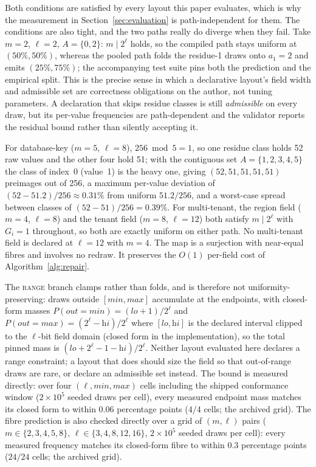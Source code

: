 \documentclass{svproc}
\begin{document}
Both conditions are satisfied by every layout this paper evaluates, which is why the measurement in Section~\ref{sec:evaluation} is path-independent for them. The conditions are also tight, and the two paths really do diverge when they fail. Take $m=2$, $\ell=2$, $A = \{0,2\}$: $m \mid 2^\ell$ holds, so the compiled path stays uniform at $(50\%, 50\%)$, whereas the pooled path folds the residue-1 draws onto $a_1 = 2$ and emits $(25\%, 75\%)$; the accompanying test suite pins both the prediction and the empirical split. This is the precise sense in which a declarative layout's field width and admissible set are correctness obligations on the author, not tuning parameters. A declaration that skips residue classes is still \emph{admissible} on every draw, but its per-value frequencies are path-dependent and the validator reports the residual bound rather than silently accepting it.

For database-key ($m=5$, $\ell=8$), $256 \bmod 5 = 1$, so one residue class holds 52 raw values and the other four hold 51; with the contiguous set $A = \{1,2,3,4,5\}$ the class of index~0 (value~1) is the heavy one, giving $(52,51,51,51,51)$ preimages out of 256, a maximum per-value deviation of $(52 - 51.2)/256 \approx 0.31\%$ from uniform $51.2/256$, and a worst-case spread between classes of $(52-51)/256 = 0.39\%$. For multi-tenant, the region field ($m=4$, $\ell=8$) and the tenant field ($m=8$, $\ell=12$) both satisfy $m \mid 2^\ell$ with $G_i = 1$ throughout, so both are exactly uniform on either path. No multi-tenant field is declared at $\ell=12$ with $m=4$. The map is a surjection with near-equal fibres and involves no redraw. It preserves the $O(1)$ per-field cost of Algorithm~\ref{alg:repair}.

The \textsc{range} branch clamps rather than folds, and is therefore not uniformity-preserving: draws outside $[\textit{min},\textit{max}]$ accumulate at the endpoints, with closed-form masses $P(\textit{out} = \textit{min}) = (\textit{lo}+1)/2^\ell$ and $P(\textit{out} = \textit{max}) = (2^\ell-\textit{hi})/2^\ell$ where $[\textit{lo},\textit{hi}]$ is the declared interval clipped to the $\ell$-bit field domain (closed form in the implementation), so the total pinned mass is $(\textit{lo} + 2^\ell - 1 - \textit{hi})/2^\ell$. Neither layout evaluated here declares a range constraint; a layout that does should size the field so that out-of-range draws are rare, or declare an admissible set instead. The bound is measured directly: over four $(\ell,\textit{min},\textit{max})$ cells including the shipped conformance window ($2\times10^5$ seeded draws per cell), every measured endpoint mass matches its closed form to within $0.06$ percentage points ($4/4$ cells; the archived grid). The fibre prediction is also checked directly over a grid of $(m,\ell)$ pairs ($m \in \{2,3,4,5,8\}$, $\ell \in \{3,4,8,12,16\}$, $2\times10^5$ seeded draws per cell): every measured frequency matches its closed-form fibre to within $0.3$ percentage points ($24/24$ cells; the archived grid).
\end{document}
